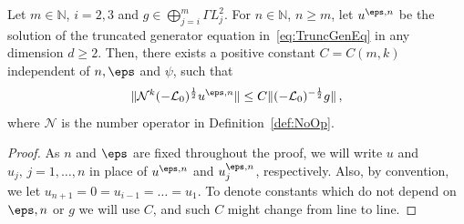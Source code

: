 \documentclass[reqno,11pt]{preprint}
\renewcommand{\N}{\mathbb{N}}
\newcommand{\cL}{\mathcal{L}}
\newcommand{\cN}{\mathcal{N}}
\newcommand{\1}{\mathds{1}}
\newcommand{\gensy}{\cL_0}
\begin{document}
\begin{proposition}\label{P:AprioriGeneratorEq}
Let $m\in\N$, {$i=2,3$} and $g\in\bigoplus_{j=i}^m\Gamma L^2_j$. For $n\in\N$, $n\geq m$, let $u^{\eps,n}$ 
be the solution of the truncated generator equation in~\eqref{eq:TruncGenEq} in any dimension $d\geq 2$. 
Then, there exists a 
positive constant $C=C(m,k)$ independent of $n,\eps$ and $\psi$, such that
\begin{equation}\label{e:AprioriMain}
\|\mathcal N^k (-\gensy)^\frac12 u^{\eps,n}\|\leq C\|(-\gensy)^{-\frac12}g\|\,,
\end{equation}
where $\cN$ is the number operator in Definition~\ref{def:NoOp}. 
\end{proposition}
\begin{proof}
As $n$ and $\eps$ are fixed throughout the proof, we will write $u$ and $u_j,\,j=1,\dots,n$ in place of 
$u^{\eps,n}$ and $u^{\eps,n}_j$, respectively. 
Also, by convention, we let $u_{n+1}=0=u_{i-1}=\dots=u_1$. To denote constants which do not depend on $\eps,n$ or $g$ 
we will use $C$, and such $C$ might change from line to line. 
%


\end{proof}
\end{document}
